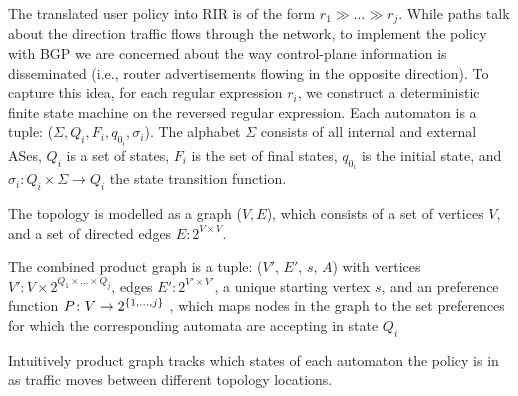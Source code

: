 
The translated user policy into RIR is of the form $r_1 \gg \dots \gg r_j$. While paths talk about the direction traffic flows through the network, to implement the policy with BGP we are concerned about the way control-plane information is disseminated (i.e., router advertisements flowing in the opposite direction). To capture this idea, for each regular expression $r_i$, we construct a deterministic finite state machine on the reversed regular expression. Each automaton is a tuple: ($\Sigma, Q_i, F_i, q_{0_i}, \sigma_i$). The alphabet $\Sigma$ consists of all internal and external ASes, $Q_i$ is a set of states, $F_i$ is the set of final states, $q_{0_i}$ is the initial state, and $\sigma_i \colon Q_i \times \Sigma \rightarrow Q_i$ the state transition function.

The topology is modelled as a graph ($V, E$), which consists of a set of vertices $V$, and a set of directed edges $E \colon 2^{V \times V}$.


The combined product graph is a tuple: ($V'$, $E'$, $s$, $A$) with 
vertices $V' \colon V \times 2^{Q_1 \times \dots \times Q_j}$, 
edges $E' \colon 2^{V' \times V'}$, 
a unique starting vertex $s$, 
and an preference function $P \colon V \rightarrow 2^{\{ 1, \dots, j \} }$ , which maps nodes in the graph to the set preferences for which the corresponding automata are accepting in state $Q_i$



Intuitively product graph tracks which states of each automaton the policy is in as traffic moves between different topology locations. 

